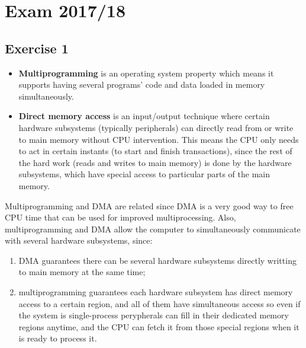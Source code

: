 \setcounter{chapter}{17}
\chapter{Exam 2017/18}
{
\renewcommand{\thesubsection}{\thesection\alph{subsection}}
\section{Exercise 1}
\begin{itemize}
    \item \textbf{Multiprogramming} is an operating system property which means it supports having several programs' code and data loaded in memory simultaneously.
    \item \textbf{Direct memory access} is an input/output technique where certain hardware subsystems (typically peripherals) can directly read from or write to main memory without CPU intervention. This means the CPU only needs to act in certain instants (to start and finish transactions), since the rest of the hard work (reads and writes to main memory) is done by the hardware subsystems, which have special access to particular parts of the main memory.
\end{itemize}
Multiprogramming and DMA are related since DMA is a very good way to free CPU time that can be used for improved multiprocessing. Also, multiprogramming and DMA allow the computer to simultaneously communicate with several hardware subsystems, since:
\begin{enumerate}
    \item DMA guarantees there can be several hardware subsystems directly writting to main memory at the same time;
    \item multiprogramming guarantees each hardware subsystem has direct memory access to a certain region, and all of them have simultaneous access so even if the system is single-process perypherals can fill in their dedicated memory regions anytime, and the CPU can fetch it from those special regions when it is ready to process it.
\end{enumerate}
}
